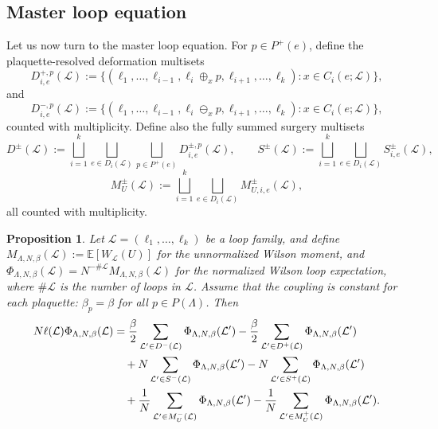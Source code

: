 \documentclass[11pt,a4paper,reqno]{article}
\newtheorem{proposition}[theorem]{Proposition}
\theoremstyle{definition}
\theoremstyle{remark}
\newcommand\Lc{{\mathcal{L}}}
\begin{document}
\subsection{Master loop equation}

Let us now turn to the master loop equation. For $p\in P^+(e)$, define the plaquette-resolved deformation multisets
\[
D^{+,p}_{i,e}(\Lc):=\{(\ell_1,\dots,\ell_{i-1},\ell_i\oplus_x p,\ell_{i+1},\dots,\ell_k):x\in C_i(e;\Lc)\},
\]
and
\[
D^{-,p}_{i,e}(\Lc):=\{(\ell_1,\dots,\ell_{i-1},\ell_i\ominus_x p,\ell_{i+1},\dots,\ell_k):x\in C_i(e;\Lc)\},
\]
counted with multiplicity. Define also the fully summed surgery multisets
\[
D^\pm(\Lc):=\bigsqcup_{i=1}^k \bigsqcup_{e\in D_i(\Lc)} \bigsqcup_{p\in P^+(e)} D^{\pm,p}_{i,e}(\Lc),\qquad S^\pm(\Lc):=\bigsqcup_{i=1}^k \bigsqcup_{e\in D_i(\Lc)} S^\pm_{i,e}(\Lc),
\]
\[
M_U^\pm(\Lc):=\bigsqcup_{i=1}^k \bigsqcup_{e\in D_i(\Lc)} M^\pm_{U,i,e}(\Lc),
\]
all counted with multiplicity.

\begin{proposition}\label{prop:wilson-master}
Let $\Lc=(\ell_1,\dots,\ell_k)$ be a loop family, and define $M_{\Lambda,N,\beta}(\Lc):=\mathbb E[W_\Lc(U)]$ for the unnormalized Wilson moment, and $\Phi_{\Lambda,N,\beta}(\Lc)=N^{-\#\Lc}M_{\Lambda,N,\beta}(\Lc)$ for the normalized Wilson loop expectation, where $\#\Lc$ is the number of loops in $\Lc$. Assume that the coupling is constant for each plaquette: $\beta_p=\beta$ for all $p\in P(\Lambda)$. Then
\begin{align}
N\ell(\Lc)\Phi_{\Lambda,N,\beta}(\Lc)&=\frac{\beta}{2}
\sum_{\Lc'\in D^-(\Lc)} \Phi_{\Lambda,N,\beta}(\Lc')-\frac{\beta}{2}
\sum_{\Lc'\in D^+(\Lc)} \Phi_{\Lambda,N,\beta}(\Lc')\notag\\
&\quad+N\sum_{\Lc'\in S^-(\Lc)} \Phi_{\Lambda,N,\beta}(\Lc')-N\sum_{\Lc'\in S^+(\Lc)} \Phi_{\Lambda,N,\beta}(\Lc')\notag\\
&\quad+\frac1N\sum_{\Lc'\in M_U^-(\Lc)} \Phi_{\Lambda,N,\beta}(\Lc')-\frac1N\sum_{\Lc'\in M_U^+(\Lc)} \Phi_{\Lambda,N,\beta}(\Lc').
\label{eq:fully-summed-wilson-mle-normalized}
\end{align}
\end{proposition}
\end{document}
